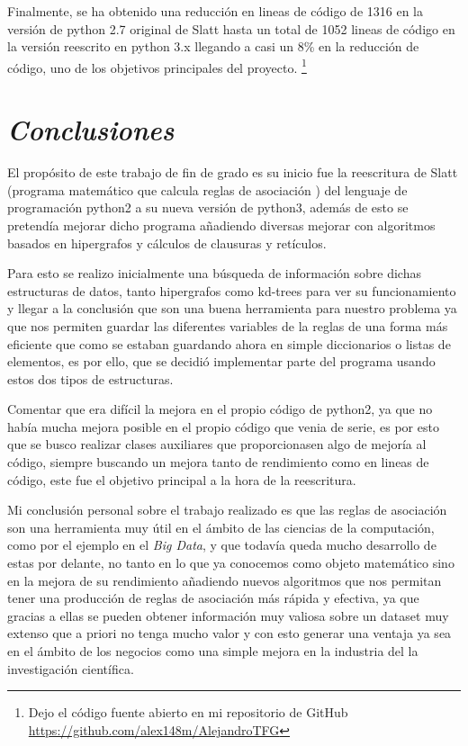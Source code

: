 \documentclass{cosas/tfg_domingo}
\begin{document}
Finalmente, se ha obtenido una reducción en lineas de código de 1316 en la versión de python 2.7 original de Slatt hasta un total de 1052 lineas de código en la versión reescrito en python 3.x llegando a casi un 8\% en la reducción de código, uno de los objetivos principales del proyecto. \footnote{Dejo el código fuente abierto en mi repositorio de GitHub \url{https://github.com/alex148m/AlejandroTFG}}




\chapter{\emph{Conclusiones}}

El propósito de este trabajo de fin de grado es su inicio fue la reescritura de Slatt (programa matemático que calcula reglas de asociación ) del lenguaje de programación python2 a su nueva versión de python3, además de esto se pretendía mejorar dicho programa añadiendo diversas mejorar con algoritmos basados en hipergrafos y cálculos de clausuras y retículos.

Para esto se realizo inicialmente una búsqueda de información sobre dichas estructuras de datos, tanto hipergrafos como kd-trees para ver su funcionamiento y llegar a la conclusión que son una buena herramienta para nuestro problema ya que nos permiten guardar las diferentes variables de la reglas de una forma más eficiente que como se estaban guardando ahora en simple diccionarios o listas de elementos, es por ello, que se decidió implementar parte del programa usando estos dos tipos de estructuras.

\hfill

Comentar que era difícil la mejora en el propio código de python2, ya que no había mucha mejora posible en el propio código que venia de serie, es por esto que se busco realizar clases auxiliares que proporcionasen algo de mejoría al código, siempre buscando un mejora tanto de rendimiento como en lineas de código, este fue el objetivo principal a la hora de la reescritura.

\hfill

Mi conclusión personal sobre el trabajo realizado es que las reglas de asociación son una herramienta muy útil en el ámbito de las ciencias de la computación, como por el ejemplo en el \textit{Big Data}, y que todavía queda mucho desarrollo de estas por delante, no tanto en lo que ya conocemos como objeto matemático sino en la mejora de su rendimiento añadiendo nuevos algoritmos que nos permitan tener una producción de reglas de asociación más rápida y efectiva, ya que gracias a ellas se pueden obtener información muy valiosa sobre un dataset muy extenso que a priori no tenga mucho valor y con esto generar una ventaja ya sea en el ámbito de los negocios como una simple mejora en la industria del la investigación científica.


\end{document}
